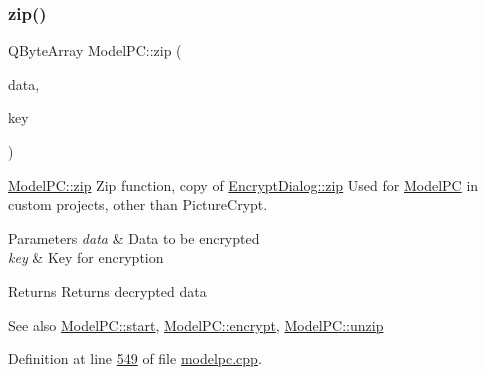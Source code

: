 \subsubsection{\texorpdfstring{zip()}{zip()}}
{\footnotesize\ttfamily Q\+Byte\+Array Model\+P\+C\+::zip (\begin{DoxyParamCaption}\item[{Q\+Byte\+Array}]{data,  }\item[{Q\+Byte\+Array}]{key }\end{DoxyParamCaption})\hspace{0.3cm}{\ttfamily [protected]}}



\mbox{\hyperlink{class_model_p_c_afebbbfa4b07deba4f68fc6dfb50f353f}{Model\+P\+C\+::zip}} Zip function, copy of \mbox{\hyperlink{class_encrypt_dialog_a2bff820a3df4ddc36ecb07ed74b7138a}{Encrypt\+Dialog\+::zip}} Used for \mbox{\hyperlink{class_model_p_c}{Model\+PC}} in custom projects, other than Picture\+Crypt. 


\begin{DoxyParams}{Parameters}
{\em data} & Data to be encrypted \\
\hline
{\em key} & Key for encryption \\
\hline
\end{DoxyParams}
\begin{DoxyReturn}{Returns}
Returns decrypted data 
\end{DoxyReturn}
\begin{DoxySeeAlso}{See also}
\mbox{\hyperlink{class_model_p_c_a3cae34fd5bcb06e8c1f8cfe7961bd270}{Model\+P\+C\+::start}}, \mbox{\hyperlink{class_model_p_c_a8ef76567bc0c0307b4e2547c46536e51}{Model\+P\+C\+::encrypt}}, \mbox{\hyperlink{class_model_p_c_a6da88f166785a49f73b22c169f956fd0}{Model\+P\+C\+::unzip}} 
\end{DoxySeeAlso}


Definition at line \mbox{\hyperlink{modelpc_8cpp_source_l00549}{549}} of file \mbox{\hyperlink{modelpc_8cpp_source}{modelpc.\+cpp}}.

